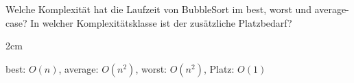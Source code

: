 \question[2]
Welche Komplexität hat die Laufzeit von BubbleSort im best, worst und average-case?
In welcher Komplexitätsklasse ist der zusätzliche Platzbedarf?

\begin{solutionbox}{2cm}

best: $O(n)$, average: $O(n^2)$, worst: $O(n^2)$, Platz: $O(1)$
\end{solutionbox}
